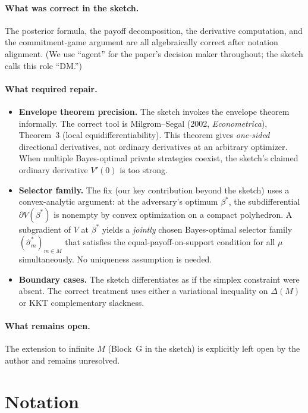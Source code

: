 \documentclass[12pt]{article}
\begin{document}
\paragraph{What was correct in the sketch.}
The posterior formula, the payoff decomposition, the derivative computation, and the commitment-game argument are all algebraically correct after notation alignment. (We use ``agent'' for the paper's decision maker throughout; the sketch calls this role ``DM.'')

\paragraph{What required repair.}
\begin{itemize}
\item \textbf{Envelope theorem precision.} The sketch invokes the envelope theorem informally. The correct tool is Milgrom--Segal (2002, \textit{Econometrica}), Theorem~3 (local equidifferentiability). This theorem gives \emph{one-sided} directional derivatives, not ordinary derivatives at an arbitrary optimizer. When multiple Bayes-optimal private strategies coexist, the sketch's claimed ordinary derivative $V'(0)$ is too strong.
\item \textbf{Selector family.} The fix (our key contribution beyond the sketch) uses a convex-analytic argument: at the adversary's optimum $\beta^*$, the subdifferential $\partial V(\beta^*)$ is nonempty by convex optimization on a compact polyhedron. A subgradient of $V$ at $\beta^*$ yields a \emph{jointly} chosen Bayes-optimal selector family $(\hat\sigma^*_m)_{m \in M}$ that satisfies the equal-payoff-on-support condition for all $\mu$ simultaneously. No uniqueness assumption is needed.
\item \textbf{Boundary cases.} The sketch differentiates as if the simplex constraint were absent. The correct treatment uses either a variational inequality on $\Delta(M)$ or KKT complementary slackness.
\end{itemize}

\paragraph{What remains open.} The extension to infinite $M$ (Block~G in the sketch) is explicitly left open by the author and remains unresolved.

\section{Notation}
\label{sec:notation}
\end{document}
